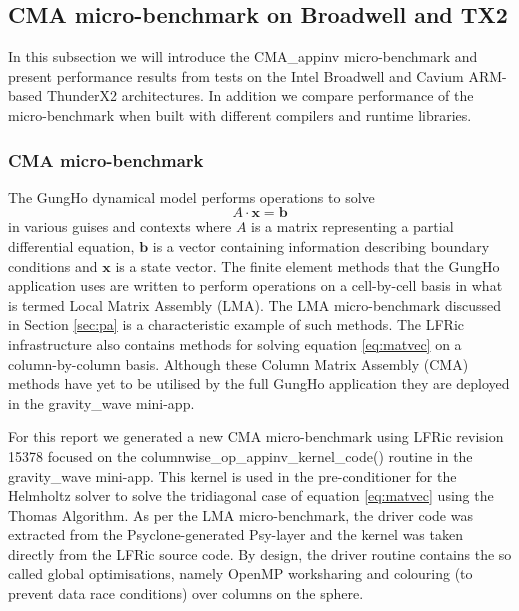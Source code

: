 \subsection{CMA micro-benchmark on Broadwell and TX2}
\label{sec:pa-microbenchmark}
In this subsection we will introduce the CMA\_appinv micro-benchmark and present performance results from tests on the Intel Broadwell and Cavium ARM-based ThunderX2 architectures.
In addition we compare performance of the micro-benchmark when built with different compilers and runtime libraries.

\subsubsection{CMA micro-benchmark}

The GungHo dynamical model performs operations to solve
\begin{equation} \label{eq:matvec}
A \cdot \mathbf{x} = \mathbf{b}
\end{equation}
in various guises and contexts where $A$ is a matrix representing a partial differential equation, $\mathbf{b}$ is a vector containing information describing boundary conditions and $\mathbf{x}$ is a state vector.
The finite element methods that the GungHo application uses are written to perform operations on a cell-by-cell basis in what is termed Local Matrix Assembly (LMA).
The LMA micro-benchmark discussed in Section \ref{sec:pa} is a characteristic example of such methods.
The LFRic infrastructure also contains methods for solving equation \ref{eq:matvec} on a column-by-column basis.
Although these Column Matrix Assembly (CMA) methods have yet to be utilised by the full GungHo application they are deployed in the gravity\_wave mini-app.

For this report we generated a new CMA micro-benchmark using LFRic revision 15378 focused on the columnwise\_op\_appinv\_kernel\_code() routine in the gravity\_wave mini-app.
This kernel is used in the pre-conditioner for the Helmholtz solver to solve the tridiagonal case of equation \ref{eq:matvec} using the Thomas Algorithm.
As per the LMA micro-benchmark, the driver code was extracted from the Psyclone-generated Psy-layer and the kernel was taken directly from the LFRic source code.
By design, the driver routine contains the so called global optimisations, namely OpenMP worksharing and colouring (to prevent data race conditions) over columns on the sphere.

